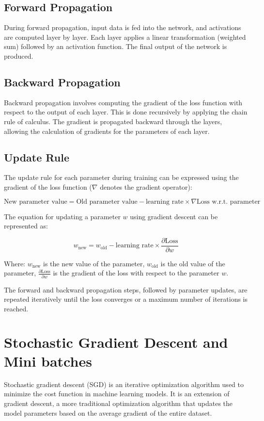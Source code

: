 \documentclass{report}
\begin{document}
\subsection{Forward Propagation}
    
    During forward propagation, input data is fed into the network, and activations are computed layer by layer. Each layer applies a linear transformation (weighted sum) followed by an activation function. The final output of the network is produced.
    
\subsection{Backward Propagation}
    
    Backward propagation involves computing the gradient of the loss function with respect to the output of each layer. This is done recursively by applying the chain rule of calculus. The gradient is propagated backward through the layers, allowing the calculation of gradients for the parameters of each layer.
    
\subsection{Update Rule}
    
    The update rule for each parameter during training can be expressed using the gradient of the loss function (\(\nabla\) denotes the gradient operator):
    
    \[ \text{New parameter value} = \text{Old parameter value} - \text{learning rate} \times \nabla \text{Loss w.r.t. parameter} \]
    
    
    The equation for updating a parameter \(w\) using gradient descent can be represented as:
    
    \[ w_{\text{new}} = w_{\text{old}} - \text{learning rate} \times \frac{\partial \text{Loss}}{\partial w} \]
    
    Where:
    \( w_{\text{new}} \) is the new value of the parameter,
    \( w_{\text{old}} \) is the old value of the parameter,
    \(\frac{\partial \text{Loss}}{\partial w}\) is the gradient of the loss with respect to the parameter \(w\).
    
    The forward and backward propagation steps, followed by parameter updates, are repeated iteratively until the loss converges or a maximum number of iterations is reached.

\section{Stochastic Gradient Descent and Mini batches}
Stochastic gradient descent (SGD) is an iterative optimization algorithm used to minimize the cost function in machine learning models. It is an extension of gradient descent, a more traditional optimization algorithm that updates the model parameters based on the average gradient of the entire dataset.
\end{document}
